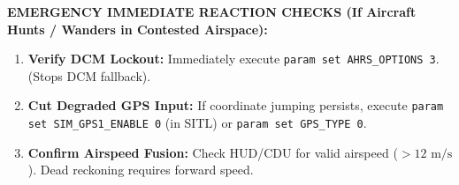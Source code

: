 \documentclass[10pt,letterpaper]{article}
\begin{document}
\vspace{3mm}
\begin{tcolorbox}[colback=aerorow,colframe=aeroborder,arc=1mm,boxrule=0.5pt,top=2mm,bottom=2mm,left=3.5mm,right=3.5mm]
\small\bfseries\color{aeroblue}
EMERGENCY IMMEDIATE REACTION CHECKS (If Aircraft Hunts / Wanders in Contested Airspace):
\begin{enumerate}[leftmargin=5mm,itemsep=1pt,topsep=1pt]
\item \textbf{Verify DCM Lockout:} Immediately execute \texttt{param set AHRS\_OPTIONS 3}. (Stops DCM fallback).
\item \textbf{Cut Degraded GPS Input:} If coordinate jumping persists, execute \texttt{param set SIM\_GPS1\_ENABLE 0} (in SITL) or \texttt{param set GPS\_TYPE 0}.
\item \textbf{Confirm Airspeed Fusion:} Check HUD/CDU for valid airspeed ($> 12\text{ m/s}$). Dead reckoning requires forward speed.
\end{enumerate}
\end{tcolorbox}
\end{document}
